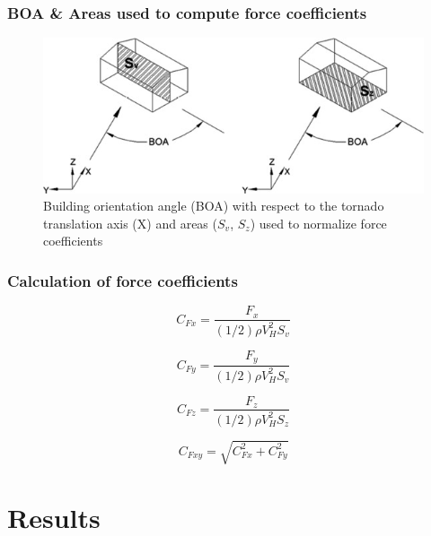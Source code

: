 \documentclass{beamer}
\begin{document}
\begin{frame}
	\frametitle{BOA \& Areas used to compute force coefficients}
	\begin{figure}
	\centering
	\caption{Building orientation angle (BOA) with respect to the tornado translation axis (X) and areas ($S_v$, $S_z$) used to normalize force coefficients}
		\includegraphics[width=\textwidth]{./fig/3.jpg}
	\end{figure}
	
	
\end{frame}

\begin{frame}
	\frametitle{Calculation of force coefficients}
	\begin{equation}
		C_{Fx}=\frac{F_x}{(1/2)\rho V_H^2 S_v}
	\end{equation}
	
	\begin{equation}
		C_{Fy}=\frac{F_y}{(1/2)\rho V_H^2 S_v}
	\end{equation}
	
	\begin{equation}
		C_{Fz}=\frac{F_z}{(1/2)\rho V_H^2 S_z}
	\end{equation}
	
	\begin{equation}
		C_{Fxy}=\sqrt{C_{Fx}^2+C_{Fy}^2}
	\end{equation}
\end{frame}

\section{Results}
\end{document}
